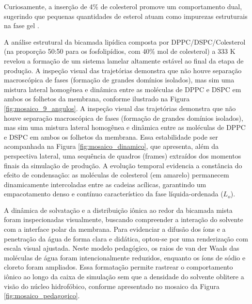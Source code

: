 Curiosamente, a inserção de 4\% de colesterol promove um comportamento dual, sugerindo que pequenas quantidades de esterol atuam como impurezas estruturais na fase gel \cite{pedersen2024}.

A análise estrutural da bicamada lipídica composta por DPPC/DSPC/Colesterol (na proporção 50:50 para os fosfolipídios, com 40\% mol de colesterol) a 333 K revelou a formação de um sistema lamelar altamente estável ao final da etapa de produção. A inspeção visual das trajetórias demonstra que não houve separação macroscópica de fases (formação de grandes domínios isolados), mas sim uma mistura lateral homogênea e dinâmica entre as moléculas de DPPC e DSPC em ambos os folhetos da membrana, conforme ilustrado na Figura \ref{fig:mosaico_9_angulos}.
A inspeção visual das trajetórias demonstra que não houve separação macroscópica de fases (formação de grandes domínios isolados), mas sim uma mistura lateral homogênea e dinâmica entre as moléculas de DPPC e DSPC em ambos os folhetos da membrana. Essa estabilidade pode ser acompanhada na Figura \ref{fig:mosaico_dinamico}, que apresenta, além da perspectiva lateral, uma sequência de quadros (frames) extraídos dos momentos finais da simulação de produção. A evolução temporal evidencia a constância do efeito de condensação: as moléculas de colesterol (em amarelo) permanecem dinamicamente intercoladas entre as cadeias acílicas, garantindo um empacotamento denso e contínuo característico da fase líquida-ordenada ($L_o$).

A dinâmica de solvatação e a distribuição iônica ao redor da bicamada mista foram inspecionadas visualmente, buscando compreender a interação do solvente com a interface polar da membrana. Para evidenciar a difusão dos íons e a penetração da água de forma clara e didática, optou-se por uma renderização com escala visual ajustada. Neste modelo pedagógico, os raios de van der Waals das moléculas de água foram intencionalmente reduzidos, enquanto os íons de sódio e cloreto foram ampliados. Essa formatação permite rastrear o comportamento iônico ao longo da caixa de simulação sem que a densidade do solvente oblitere a visão do núcleo hidrofóbico, conforme apresentado no mosaico da Figura \ref{fig:mosaico_pedagogico}.

